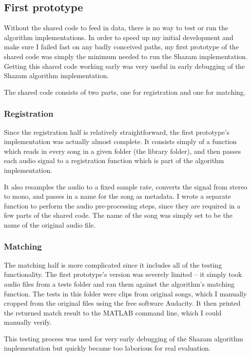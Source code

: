 \documentclass[12pt,a4paper,twoside,openright]{report}
\begin{document}
\subsection{First prototype}

Without the shared code to feed in data, there is no way to test or run the algorithm implementations. In order to speed up my initial development and make sure I failed fast on any badly conceived paths, my first prototype of the shared code was simply the minimum needed to run the Shazam implementation. Getting this shared code working early was very useful in early debugging of the Shazam algorithm implementation.

The shared code consists of two parts, one for registration and one for matching. 

\subsubsection{Registration}

Since the registration half is relatively straightforward, the first prototype's implementation was actually almost complete. It consists simply of a function which reads in every song in a given folder (the library folder), and then passes each audio signal to a registration function which is part of the algorithm implementation. 

It also resamples the audio to a fixed sample rate, converts the signal from stereo to mono, and passes in a name for the song as metadata. I wrote a separate function to perform the audio pre-processing steps, since they are required in a few parts of the shared code. The name of the song was simply set to be the name of the original audio file.

\subsubsection{Matching}

The matching half is more complicated since it includes all of the testing functionality. The first prototype's version was severely limited -- it simply took audio files from a tests folder and ran them against the algorithm's matching function. The tests in this folder were clips from original songs, which I manually cropped from the original files using the free software Audacity. It then printed the returned match result to the MATLAB command line, which I could manually verify.

This testing process was used for very early debugging of the Shazam algorithm implementation but quickly became too laborious for real evaluation.
\end{document}
